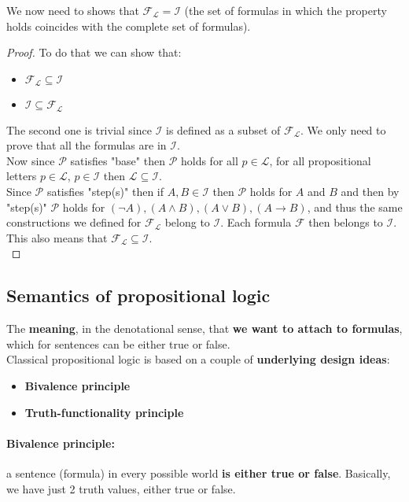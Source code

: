 \documentclass[11pt]{article}
\begin{document}
	We now need to shows that $\mathcal{F}_{\mathcal{L}} = \mathcal{I}$ (the set of formulas in which the property holds coincides with the complete set of formulas).
	
	\begin{proof}
		To do that we can show that:
		\begin{itemize}
			\item $\mathcal{F}_{\mathcal{L}} \subseteq \mathcal{I}$
			\item $\mathcal{I} \subseteq \mathcal{F}_{\mathcal{L}}$
		\end{itemize} 
		The second one is trivial since $\mathcal{I}$ is defined as a subset of $\mathcal{F}_{\mathcal{L}}$. We only need to prove that all the formulas are in $\mathcal{I}$.\\
		
		Now since $\mathcal{P}$ satisfies "base" then $\mathcal{P}$ holds for all $p \in \mathcal{L}$, for all propositional letters $p \in \mathcal{L}$, $p \in \mathcal{I}$ then $\mathcal{L} \subseteq \mathcal{I}$. \\
		Since $\mathcal{P}$ satisfies "step(s)" then if $A,B \in \mathcal{I}$ then $\mathcal{P}$ holds for $A$ and $B$ and then by "step(s)" $\mathcal{P}$ holds for $(\neg A), (A \wedge B), (A \vee B), (A \rightarrow B)$, and thus the same constructions we defined for $\mathcal{F}_{\mathcal{L}}$ belong to $\mathcal{I}$. Each formula $\mathcal{F}$ then belongs to $\mathcal{I}$. This also means that $\mathcal{F}_{\mathcal{L}} \subseteq \mathcal{I}$.\\
	\end{proof}
	
	\subsection{Semantics of propositional logic}
	The \textbf{meaning}, in the denotational sense, that \textbf{we want to attach to formulas}, which for sentences can be either true or false.\\
	
	Classical propositional logic is based on a couple of \textbf{underlying design ideas}:
	\begin{itemize}
		\item \textbf{Bivalence principle}
		\item \textbf{Truth-functionality principle }
	\end{itemize}
	
	\paragraph{Bivalence principle:} a sentence (formula) in every possible world \textbf{is either true or false}. Basically, we have just 2 truth values, either true or false. \\
	
\end{document}
